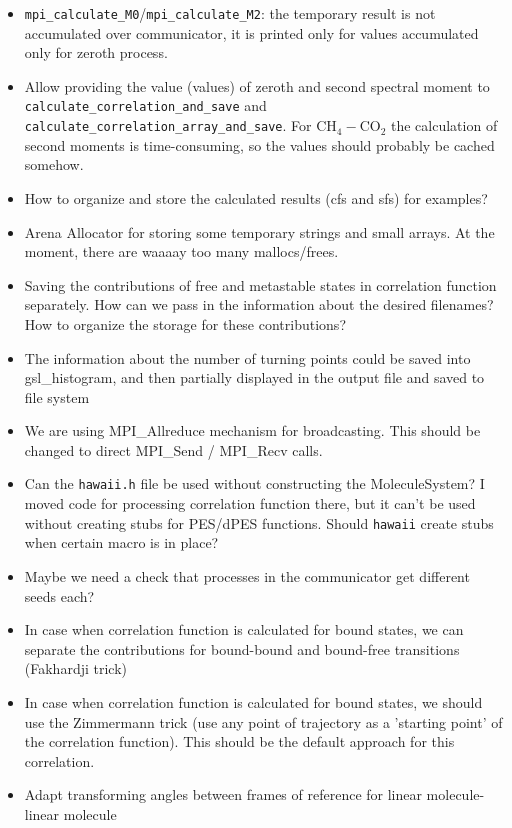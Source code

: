 \documentclass{article}
\begin{document}
\begin{itemize}
    \item \texttt{mpi\_calculate\_M0}/\texttt{mpi\_calculate\_M2}: the temporary result is not accumulated over communicator, it is printed only for values accumulated only for zeroth process.
    \item Allow providing the value (values) of zeroth and second spectral moment to \texttt{calculate\_correlation\_and\_save} and \texttt{calculate\_correlation\_array\_and\_save}. {\color{red} For CH$_4-$CO$_2$ the calculation of second moments is time-consuming, so the values should probably be cached somehow.}
    \item How to organize and store the calculated results (cfs and sfs) for examples?
    \item Arena Allocator for storing some temporary strings and small arrays. At the moment, there are waaaay too many mallocs/frees. 
    \item Saving the contributions of free and metastable states in correlation function separately. How can we pass in the information about the desired filenames? How to organize the storage for these contributions? 
    \item The information about the number of turning points could be saved into gsl\_histogram, and then partially displayed in the output file and saved to file system
    \item We are using MPI\_Allreduce mechanism for broadcasting. This should be changed to direct MPI\_Send / MPI\_Recv calls.
    \item Can the \texttt{hawaii.h} file be used without constructing the MoleculeSystem? I moved code for processing correlation function there, but it can't be used without creating stubs for PES/dPES functions. Should \texttt{hawaii} create stubs when certain macro is in place? 
    \item Maybe we need a check that processes in the communicator get different seeds each?
    \item In case when correlation function is calculated for bound states, we can separate the contributions for bound-bound and bound-free transitions (Fakhardji trick)
    \item In case when correlation function is calculated for bound states, we should use the Zimmermann trick (use any point of trajectory as a 'starting point' of the correlation function). This should be the default approach for this correlation. 
    \item Adapt transforming angles between frames of reference for linear molecule-linear molecule

\end{itemize}
\end{document}
